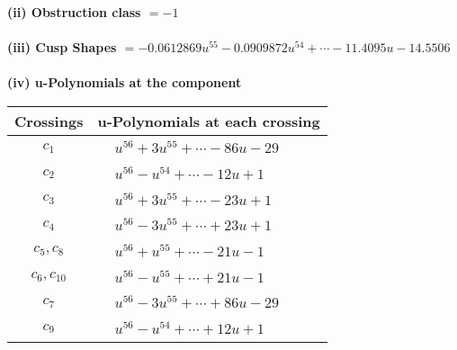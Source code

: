 \documentclass[1p]{elsarticle_modified}
\theoremstyle{definition}
\begin{document}
\flushleft \textbf{(ii) Obstruction class $= -1$}\\~\\
\flushleft \textbf{(iii) Cusp Shapes $= -0.0612869 u^{55}-0.0909872 u^{54}+\cdots-11.4095 u-14.5506$}\\~\\
\newpage\renewcommand{\arraystretch}{1}
\flushleft \textbf{(iv) u-Polynomials at the component}\newline \\
\begin{tabular}{m{50pt}|m{274pt}}
Crossings & \hspace{64pt}u-Polynomials at each crossing \\
\hline $$\begin{aligned}c_{1}\end{aligned}$$&$\begin{aligned}
&u^{56}+3 u^{55}+\cdots-86 u-29
\end{aligned}$\\
\hline $$\begin{aligned}c_{2}\end{aligned}$$&$\begin{aligned}
&u^{56}- u^{54}+\cdots-12 u+1
\end{aligned}$\\
\hline $$\begin{aligned}c_{3}\end{aligned}$$&$\begin{aligned}
&u^{56}+3 u^{55}+\cdots-23 u+1
\end{aligned}$\\
\hline $$\begin{aligned}c_{4}\end{aligned}$$&$\begin{aligned}
&u^{56}-3 u^{55}+\cdots+23 u+1
\end{aligned}$\\
\hline $$\begin{aligned}c_{5},c_{8}\end{aligned}$$&$\begin{aligned}
&u^{56}+u^{55}+\cdots-21 u-1
\end{aligned}$\\
\hline $$\begin{aligned}c_{6},c_{10}\end{aligned}$$&$\begin{aligned}
&u^{56}- u^{55}+\cdots+21 u-1
\end{aligned}$\\
\hline $$\begin{aligned}c_{7}\end{aligned}$$&$\begin{aligned}
&u^{56}-3 u^{55}+\cdots+86 u-29
\end{aligned}$\\
\hline $$\begin{aligned}c_{9}\end{aligned}$$&$\begin{aligned}
&u^{56}- u^{54}+\cdots+12 u+1
\end{aligned}$\\
\hline
\end{tabular}\\~\\
\end{document}
